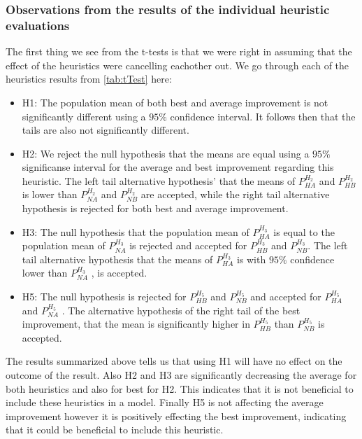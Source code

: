 \documentclass[../main.tex]{subfiles}
\begin{document}
\subsubsection{Observations from the results of the individual heuristic evaluations}
The first thing we see from the t-tests is that we were right in assuming that the effect of the heuristics were cancelling eachother out. 
We go through each of the heuristics results from \cref{tab:tTest} here:
\begin{itemize}
    \item H1: The population mean of both best and average improvement is not significantly different using a $95\%$ confidence interval. It follows then that the tails are also not significantly different.
    \item H2: We reject the null hypothesis that the means are equal using a $95\%$ significanse interval for the average and best improvement regarding this heuristic. 
        The left tail alternative hypothesis' that the means of $P^{H_2}_{HA}$ and $P^{H_2}_{HB}$ is lower than $P^{H_2}_{NA}$ and $P^{H_2}_{NB}$ are accepted, while the right tail alternative hypothesis is rejected for both best and average improvement.
    \item H3: The null hypothesis that the population mean of $P^{H_3}_{HA}$ is equal to the population mean of $P^{H_3}_{NA}$ is rejected and accepted for $P^{H_3}_{HB}$ and $P^{H_3}_{NB}$. The left tail alternative hypothesis that the means of $P^{H_3}_{HA}$ is with $95\%$ confidence lower than $P^{H_3}_{NA}$ , is accepted.
    \item H5: The null hypothesis is rejected for  $P^{H_5}_{HB}$ and  $P^{H_5}_{NB}$ and accepted for $P^{H_5}_{HA}$ and $P^{H_5}_{NA}$ . The alternative hypothesis of the right tail of the best improvement, that the mean is significantly higher in $P^{H_5}_{HB}$ than  $P^{H_5}_{NB}$ is accepted.
\end{itemize}

The results summarized above tells us that using H1 will have no effect on the outcome of the result. 
Also H2 and H3 are significantly decreasing the average for both heuristics and also for best for H2. 
This indicates that it is not beneficial to include these heuristics in a model.
Finally H5 is not affecting the average improvement however it is positively effecting the best improvement, indicating that it could be beneficial to include this heuristic.
\end{document}
